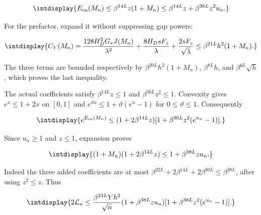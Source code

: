 \begingroup\renewcommand{\theHequation}{intdisplay.475}
\begin{equation*}
\intdisplay{
E_{\mathrm{en}}(M_n)\le\beta^{14L}z(1+M_n)
\le\beta^{14L}z+\beta^{36L}z^2u_n.
}
\end{equation*}
\endgroup


For the prefactor, expand it without suppressing gap powers:


\begingroup\renewcommand{\theHequation}{intdisplay.476}
\begin{equation*}
\intdisplay{
C_Y(M_n)=\frac{128H_D^2G_*J(M_n)}{\lambda^2}
+\frac{8H_DsF_z}{\lambda}+\frac{2sF_z}{\sqrt\lambda}
\le\beta^{21L}h^2(1+M_n).
}
\end{equation*}
\endgroup


The three terms are bounded respectively by \(\beta^{20L}h^2(1+M_n)\), \(\beta^{8L}h\), and \(\beta^{6L}\sqrt h\), which proves the last inequality.



The actual coefficients satisfy \(\beta^{14L}z\le1\) and \(\beta^{36L}z^2\le1\). Convexity gives \(e^x\le1+2x\) on \([0,\allowbreak 1]\) and \(e^{\vartheta u}\le1+\vartheta(e^u-1)\) for \(0\le\vartheta\le1\). Consequently


\begingroup\renewcommand{\theHequation}{intdisplay.477}
\begin{equation*}
\intdisplay{
e^{E_{\mathrm{en}}(M_n)}\le
(1+2\beta^{14L}z)
[1+\beta^{36L}z^2(e^{u_n}-1)].
}
\end{equation*}
\endgroup


Since \(u_n\ge1\) and \(z\le1\), expansion proves


\begingroup\renewcommand{\theHequation}{intdisplay.478}
\begin{equation*}
\intdisplay{
(1+M_n)(1+2\beta^{14L}z)
\le1+\beta^{38L}zu_n.
}
\end{equation*}
\endgroup


Indeed the three added coefficients are at most \(\beta^{22L}+2\beta^{14L}+2\beta^{36L}\le\beta^{38L}\), after using \(z^2\le z\). Thus


\begingroup\renewcommand{\theHequation}{intdisplay.479}
\begin{equation*}
\intdisplay{
2\mathcal L_n\le\frac{\beta^{23L}Yh^2}{\sqrt n}
(1+\beta^{38L}zu_n)
[1+\beta^{36L}z^2(e^{u_n}-1)].
}
\end{equation*}
\endgroup

